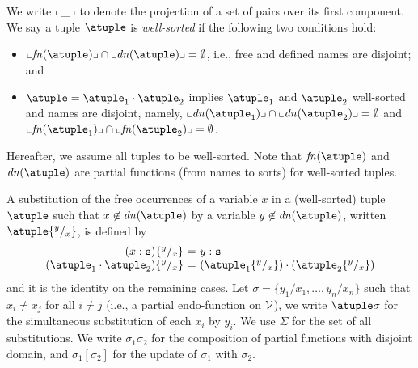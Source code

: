 We write $\llcorner\_\lrcorner$ to denote the projection of a set of pairs over its first component. 
%
We say a tuple $\atuple$ is {\em well-sorted} if the following two
conditions hold:
\begin{itemize}
\item
  $\supp{\fn\atuple} \cap \supp{\dn{\atuple}} = \emptyset$, i.e., free and
  defined names are disjoint; and
\item
  $\atuple = \atuple_1 \cdot \atuple_2$ implies $\atuple_1$ and
  $\atuple_2$ well-sorted and  names are disjoint, namely, 
  $\supp{\dn{\atuple_1}} \cap \supp{\dn{\atuple_2}} =  \emptyset$
  and 
  $\supp{\fn{\atuple_1}} \cap \supp{\fn{\atuple_2}} =  \emptyset$.
\end{itemize}
%
Hereafter, we assume all tuples to be well-sorted.
%
Note that $\fn{\atuple}$ and $\dn{\atuple}$ are partial functions (from names to sorts)
for well-sorted tuples.

A substitution of the free occurrences of a variable
$x$ in a (well-sorted) tuple $\atuple$ such that $x\not\in \dn{\atuple}$
 by a variable $y\not\in \dn{\atuple}$, written
$\atuple \sust x y$, is defined by
%
\[
\begin{array}{r@{}l@{\ = \ } ll}
(x  : \asort)
&
\sust x y  
&  
y : \asort
\\
(\atuple_1 \cdot \atuple_2)
&
\sust x y  
& 
(\atuple_1\sust x y) \cdot (\atuple_2\sust x y) 
\end{array}
\]
%
and it is the identity on the remaining cases. Let
$\sigma = \{y_1/x_1,\ldots,y_n/x_n\}$ such that $x_i\neq x_j$ for all
$i\neq j$ (i.e., a partial endo-function on $\mathcal{V}$), we write
$\atuple\sigma$ for the simultaneous substitution of each $x_i$ by
$y_i$.
%
We use $\Sigma$ for the set of all substitutions. We write
$\sigma_1\sigma_2$ for the composition of partial functions with
disjoint domain, and $\sigma_1[\sigma_2]$ for the update of $\sigma_1$
with $\sigma_2$.


